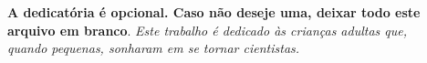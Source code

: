 \begin{dedicatoria}
\vspace*{\fill}
\centering
\noindent
\textbf{A dedicatória é opcional. Caso não deseje uma, deixar todo este
arquivo em branco}.
\textit{Este trabalho é dedicado às crianças adultas que,\\
quando pequenas, sonharam em se tornar cientistas.} \vspace*{\fill}
\end{dedicatoria}